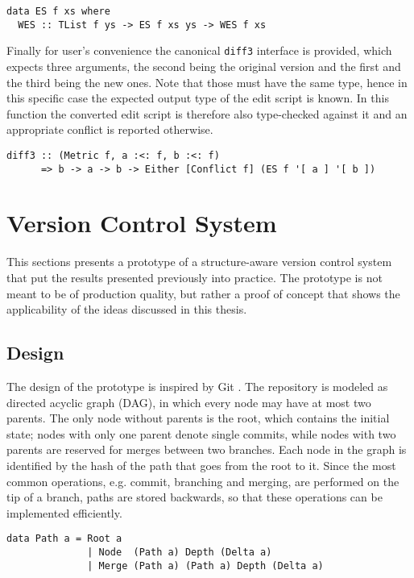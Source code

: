 \documentclass[../Thesis.tex]{subfiles}
\begin{document}
\begin{verbatim}
data ES f xs where
  WES :: TList f ys -> ES f xs ys -> WES f xs
\end{verbatim}

	Finally for user's convenience the canonical \texttt{diff3} interface is
	provided, which expects three arguments, the second 
	being the original version and the first and the third being the new ones.
	Note that those must have the same type, hence in this specific
	case the expected output type of the edit script is known.
	In this function the converted edit script is therefore also type-checked 
	against it and an appropriate conflict is reported otherwise.
	
\begin{verbatim}
diff3 :: (Metric f, a :<: f, b :<: f)
      => b -> a -> b -> Either [Conflict f] (ES f '[ a ] '[ b ])
\end{verbatim}

	\section{Version Control System}
	This sections presents a prototype of a structure-aware version control 
	system that put the results presented previously into practice.
	The prototype is not meant to be of production quality, but rather
	a proof of concept that shows the applicability of the ideas discussed 
	in this thesis.
	
	\subsection{Design}	
	The design of the prototype is inspired by Git \cite{GIT}.
	The repository is modeled as directed acyclic graph (DAG), in 
	which every node may have at most two parents. The only node without
	parents is the root, which contains the initial state; nodes
	with only one parent denote single commits, while nodes with
	two parents are reserved for merges between two 	branches.
	Each node in the graph is identified by the hash of the path that
	goes from the root to it.
	Since the most common operations, e.g. commit, branching and merging,
	are performed on the tip of a branch, paths are stored backwards,
	so that these operations can be implemented efficiently.
	
\begin{verbatim}
data Path a = Root a
              | Node  (Path a) Depth (Delta a)
              | Merge (Path a) (Path a) Depth (Delta a)
\end{verbatim}
			
\end{document}
